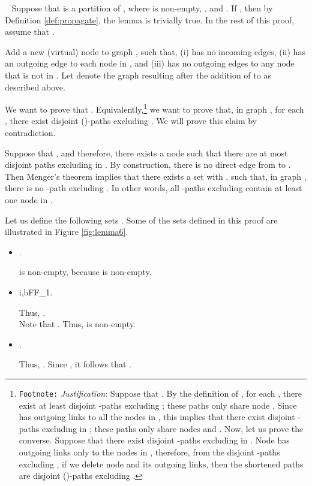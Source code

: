 \documentclass[letterpaper, 11pt]{article}
\newenvironment{proof}{\noindent {\bf Proof:}~}{\hspace*{\fill}}
\begin{document}
\begin{proof}
Suppose that  is a partition of , where
 is non-empty, , and .
If , then by Definition \ref{def:propagate},
the lemma is trivially true.
In the rest of this proof, assume that .



Add a new (virtual) node  to graph , such that, (i)  has no
incoming edges, (ii)  has an outgoing edge to each node
in , and (iii)  has no outgoing edges to any node that is not in .
Let  denote the graph resulting after the addition of  to 
as described above. 

We want to prove that .
Equivalently,\footnote{\label{f_prop} {\tt Footnote:} {\em Justification}:
Suppose that . By the definition of ,
for each ,
there exist at least  disjoint -paths excluding ;  these
paths only share
node . Since  has outgoing links to all the nodes in , this implies
that there exist  disjoint -paths excluding  in ;
these paths only share
nodes  and .
Now, let us prove the converse. Suppose that there exist
 disjoint -paths excluding  in . Node  has
outgoing links
only to the nodes in , therefore, from the  disjoint -paths
excluding , if we
delete node  and its outgoing links, then the shortened paths
are disjoint ()-paths excluding .}
we want to prove that, in graph , for each , there exist
 disjoint ()-paths excluding .
We will prove this claim by contradiction.

Suppose that , and
therefore, there exists a node  such that there are at most 
disjoint  paths excluding  in . By construction, there is no direct edge from  to . Then Menger's theorem \cite{Graph_theory_west} implies that
there exists a set  with
, such that, in graph , there is no -path
excluding . In other words, all -paths
excluding  contain at least one node in .

Let us define the following sets .
Some of the sets defined in this proof are illustrated in Figure \ref{fig:lemma6}.
\begin{itemize}
\item .
	
	 is non-empty, because  is non-empty.
\item i,bF\cup F_1.

Thus, .\\
Note that . Thus,  is non-empty.

\item . 

Thus, . Since , it follows
	that .
 
\end{itemize}


\end{proof}
\end{document}

